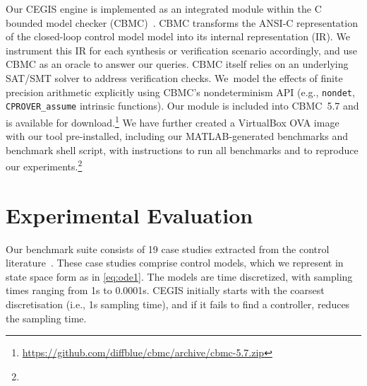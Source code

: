 Our CEGIS engine is implemented as an integrated module within the C bounded
model checker (CBMC)~\cite{ClarkeKL04}.  CBMC transforms the ANSI-C representation
of the closed-loop control model model into its internal representation (IR).  We
instrument this IR for each synthesis or verification scenario accordingly,
and use CBMC as an oracle to answer our queries.  CBMC itself relies on an
underlying SAT/SMT solver to address verification checks.  We~model the 
effects of finite precision arithmetic 
explicitly using CBMC's nondeterminism API (e.g., \texttt{nondet},
\texttt{CPROVER\_assume} intrinsic functions).  Our module is included into
CBMC~5.7 and is available for 
download.\footnote{\url{https://github.com/diffblue/cbmc/archive/cbmc-5.7.zip}}
We have further created a VirtualBox OVA image with our tool pre-installed,
including our MATLAB-generated benchmarks and benchmark shell script, 
with instructions to run all benchmarks and to reproduce our
experiments.\footnote{}
%
%

\section{Experimental Evaluation}
\label{exp:evaluation}

Our benchmark suite consists of 19 case studies extracted from the control literature~\cite{acrobot,cstr,CHEN1979389,KOKOTOVIC198023,gajic2008optimal,Franklin15, maglev, converters, CTMS, gajic2008optimal}. These case studies comprise control models, which we represent in state space form as in \eqref{eq:ode1}. 
The models are time discretized, with sampling times ranging from 1s to 0.0001s. 
CEGIS initially starts with the coarsest discretisation (i.e., 1s sampling time), and if it fails to find a controller, reduces the sampling time. 

